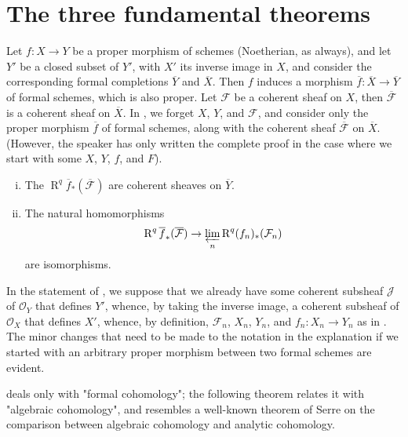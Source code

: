 \section{The three fundamental theorems}\label{fga2-3}


Let $f\colon X\to Y$ be a proper morphism of schemes (Noetherian, as always), and let $Y'$ be a closed subset of $Y'$, with $X'$ its inverse image in $X$, and consider the corresponding formal completions $\overline{Y}$ and $\overline{X}$.
Then $f$ induces a morphism $\overline{f}\colon\overline{X}\to\overline{Y}$ of formal schemes, which is also proper.
Let $\mathcal{F}$ be a coherent sheaf on $X$, then $\overline{\mathcal{F}}$ is a coherent sheaf on $\overline{X}$.
In , we forget $X$, $Y$, and $\mathcal{F}$, and consider only the proper morphism $\overline{f}$ of formal schemes, along with the coherent sheaf $\overline{\mathcal{F}}$ on $\overline{X}$.
(However, the speaker has only written the complete proof in the case where we start with some $X$, $Y$, $f$, and $F$).

\begin{theorem}\label{fga2-theorem-1}
    \begin{enumerate}[i.]
        \item The $\operatorname{R}^q\overline{f}_*(\overline{\mathcal{F}})$ are coherent sheaves on $\overline{Y}$.
        \item The natural homomorphisms
              \[\operatorname{R}^q\overline{f}_*(\overline{\mathcal{F}}) \to \varprojlim_n\operatorname{R}^q (f_n)_*(\mathcal{F}_n)\]
              are isomorphisms.
    \end{enumerate}
\end{theorem}


In the statement of , we suppose that we already have some coherent subsheaf $\mathcal{J}$ of $\mathcal{O}_Y$ that defines $Y'$, whence, by taking the inverse image, a coherent subsheaf of $\mathcal{O}_X$ that defines $X'$, whence, by definition, $\mathcal{F}_n$, $X_n$, $Y_n$, and $f_n\colon X_n\to Y_n$ as in .
The minor changes that need to be made to the notation in the explanation if we started with an arbitrary proper morphism between two formal schemes are evident.

 deals only with "formal cohomology";
the following theorem relates it with "algebraic cohomology", and resembles a well-known theorem of Serre \cite{Ser1956} on the comparison between algebraic cohomology and analytic cohomology.

